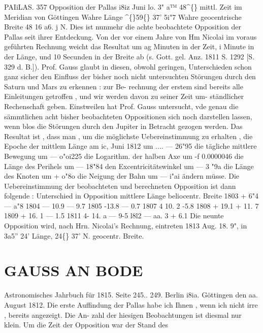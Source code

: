 \documentclass[12pt,a4paper]{article}
\newcommand{\degree}{\textdegree}
\begin{document}
\newpage
PAIiLAS. 
357 
Opposition  der  Pallas  i8iz  Juni  lo.  3"  a™  48\textasciicircum\{\}  mittl.  Zeit  im  Meridian  von  Göttingen 
Wahre  Länge   
\textasciicircum\{\}59\degree\{\}  37'    5i"7 
Wahre  geocentrische  Breite   
48    16    a6.  j  N. 
Dies  ist  nunmehr  die  achte  beobachtete  Opposition  der  Pallas  seit  ihrer  Entdeckung.  Von  der 
vor  einem  Jahre  von  Hm  Nicolai  im  voraus  geführten  Rechnung  weicht  das  Resultat  um  ag  Minuten 
in  der  Zeit,  i  Minute  in  der  Länge,  und  10  Secunden  in  der  Breite  ab  (s.  Gott.  gel.  Anz.  1811  S.  1292 
[S.  329  d.  B.]).  Prof.  Gauss  glaubt  in  diesen,  obwohl  geringen,  Unterschieden  schon  ganz  sicher  den 
Einfluss  der  bisher  noch  nicht  untersuchten  Störungen  durch  den  Saturn  und  Mars  zu  erkennen :  zur  Be- 
rechnung der  erstem  sind  bereits  alle  Einleitungen  getroffen ,  und  wir  werden  davon  zu  seiner  Zeit  um- 
ständlicher Rechenschaft  geben.  Einstweilen  hat  Prof.  Gauss  untersucht,  vde  genau  die  sämmtlichen 
acht  bisher  beobachteten  Oppositionen  sich  noch  darstellen  lassen,  wenn  blos  die  Störungen  durch  den 
Jupiter  in  Betracht  gezogen  werden.  Das  Resultat  ist ,  dass  man ,  um  die  möglichste  Uebereinstimmung 
zu  erhalten , 
die  Epoche  der  mittlem  Länge  am  ic,  Juni  1812  um     ....     ---  26"95 
die  tägliche  mittlere  Bewegung  um   
---  o"oi225 
die  Logarithm.  der  halben  Axe  um   
-f  0.0000046 
die  Länge  des  Perihels  um   
--- 18"84 
den  Excentricitätswinkel  um   
---  3  "9a 
die  Länge  des  Knoten  um   
+  o"8o 
die  Neigung  der  Bahn  um   
---  i"ai 
ändern  müsse.    Die  Uebereinstimmung  der  beobachteten  und  berechneten  Opposition  ist  dann  folgende : 
Unterschied  in 
Opposition 
mittlere  Länge beliocentr.  Breite 
1803 
+    6"4 
---  a"8 
1804 
---  10.9 
---  9.7 
1805 
-13.8 
---  0.7 
1807 
4  10. 2 
-5.8 
1808 
+  19.1 
+  11.  7 
1809 
+  16. 1 
---  1.5 
1811 
4- 14.  a 
---  9-5 
l8l2 
---  aa.  3 
+  6.1 
Die  neunte  Opposition  wird,  nach  Hrn.  Nicolai's  Rechnung,  eintreten  1813  Aug.  18.  9",  in  3a5''  24' 
Länge,  24\degree\{\}  37'  N.  geocentr.  Breite. 

\section*{GAUSS  AN  BODE}
Astronomisches  Jahrbuch  für  1815.     Seite  245..  249.     Berlin  i8ia. 
Göttingen  den  aa.  August  1812. 
Die  erste  Auffindung  der  Pallas  habe  ich  Ihnen ,  wenn  ich  nicht  irre ,  bereits  angezeigt.    Die  An- 
zahl der  hiesigen  Beobachtungen  ist  diesmal  nur  klein.    Um  die  Zeit  der  Opposition  war  der  Stand  des 
\end{document}
